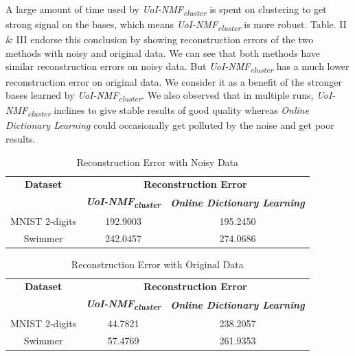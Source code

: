 \documentclass[conference]{IEEEtran}
\begin{document}
A large amount of time used by \textit{UoI-NMF\textsubscript{cluster}} is spent on clustering to get strong signal on the bases, which means \textit{UoI-NMF\textsubscript{cluster}} is more robust. Table. II \& III endorse this conclusion by showing reconstruction errors of the two methods with noisy and original data. We can see that both methods have similar reconstruction errors on noisy data. But \textit{UoI-NMF\textsubscript{cluster}} has a much lower reconstruction error on original data. We consider it as a benefit of the stronger bases learned by \textit{UoI-NMF\textsubscript{cluster}}. We also observed that in multiple runs, \textit{UoI-NMF\textsubscript{cluster}} inclines to give stable results of good quality whereas \textit{Online Dictionary Learning} could occasionally get polluted by the noise and get poor results.

\begin{table}[htbp]
\caption{Reconstruction Error with Noisy Data}
\begin{center}
\begin{tabular}{|c|c|c|}
\hline
\textbf{Dataset}&\multicolumn{2}{|c|}{\textbf{Reconstruction Error}} \\
\cline{2-3}
 & \textbf{\textit{UoI-NMF\textsubscript{cluster}}}& \textbf{\textit{Online Dictionary Learning}} \\
\hline
MNIST 2-digits & 192.9003 & 195.2450 \\
\hline
Swimmer & 242.0457 & 274.0686 \\
\hline
\end{tabular}
\label{tab2}
\end{center}
\end{table}

\begin{table}[htbp]
\caption{Reconstruction Error with Original Data}
\begin{center}
\begin{tabular}{|c|c|c|}
\hline
\textbf{Dataset}&\multicolumn{2}{|c|}{\textbf{Reconstruction Error}} \\
\cline{2-3}
 & \textbf{\textit{UoI-NMF\textsubscript{cluster}}}& \textbf{\textit{Online Dictionary Learning}} \\
\hline
MNIST 2-digits & 44.7821 & 238.2057 \\
\hline
Swimmer & 57.4769 & 261.9353 \\
\hline
\end{tabular}
\label{tab3}
\end{center}
\end{table}
\end{document}
